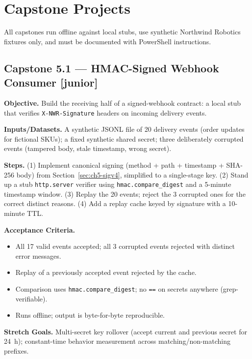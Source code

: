 \section{Capstone Projects}
\label{sec:ch5-capstones}

All capstones run offline against local stubs, use synthetic Northwind
Robotics fixtures only, and must be documented with PowerShell instructions.

\subsection*{Capstone 5.1 --- HMAC-Signed Webhook Consumer \textbf{[junior]}}

\textbf{Objective.} Build the receiving half of a signed-webhook contract: a
local stub that verifies \texttt{X-NWR-Signature} headers on incoming
delivery events.

\textbf{Inputs/Datasets.} A synthetic JSONL file of 20 delivery events
(order updates for fictional SKUs); a fixed synthetic shared secret; three
deliberately corrupted events (tampered body, stale timestamp, wrong
secret).

\textbf{Steps.} (1) Implement canonical signing (method + path + timestamp +
SHA-256 body) from Section~\ref{sec:ch5-sigv4}, simplified to a single-stage
key. (2) Stand up a stub \texttt{http.server} verifier using
\texttt{hmac.compare\_digest} and a 5-minute timestamp window. (3) Replay
the 20 events; reject the 3 corrupted ones for the correct distinct reasons.
(4) Add a replay cache keyed by signature with a 10-minute TTL.

\textbf{Acceptance Criteria.}
\begin{itemize}
  \item[$\square$] All 17 valid events accepted; all 3 corrupted events
        rejected with distinct error messages.
  \item[$\square$] Replay of a previously accepted event rejected by the
        cache.
  \item[$\square$] Comparison uses \texttt{hmac.compare\_digest}; no
        \texttt{==} on secrets anywhere (grep-verifiable).
  \item[$\square$] Runs offline; output is byte-for-byte reproducible.
\end{itemize}

\textbf{Stretch Goals.} Multi-secret key rollover (accept current and
previous secret for 24~h); constant-time behavior measurement across
matching/non-matching prefixes.

